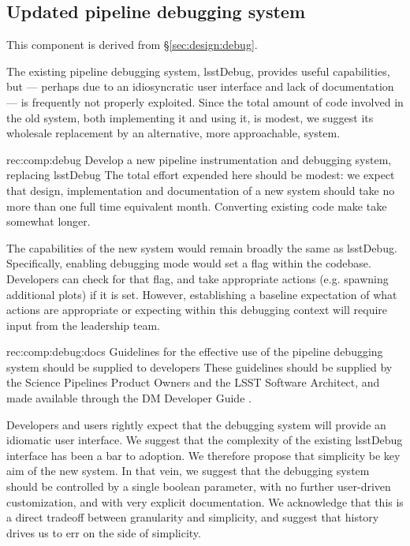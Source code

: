 \subsection{Updated pipeline debugging system}
\label{sec:comp:debug}

This component is derived from \S\ref{sec:design:debug}.

The existing pipeline debugging system, lsstDebug, provides useful
capabilities, but --- perhaps due to an idiosyncratic user interface and lack
of documentation --- is frequently not properly exploited. Since the total
amount of code involved in the old system, both implementing it and using it,
is modest, we suggest its wholesale replacement by an alternative, more
approachable, system.

\begin{recommendation}
    {rec:comp:debug}
    {Develop a new pipeline instrumentation and debugging system, replacing lsstDebug}
The total effort expended here should be modest: we expect that design,
implementation and documentation of a new system should take no more than one
full time equivalent month. Converting existing code make take somewhat
longer.
\end{recommendation}

The capabilities of the new system would remain broadly the same as lsstDebug.
Specifically, enabling debugging mode would set a flag within the codebase.
Developers can check for that flag, and take appropriate actions (e.g.
spawning additional plots) if it is set. However, establishing a baseline
expectation of what actions are appropriate or expecting within this debugging
context will require input from the leadership team.

\begin{recommendation}
    {rec:comp:debug:docs}
    {Guidelines for the effective use of the pipeline debugging system should be supplied to developers}
These guidelines should be supplied by the Science Pipelines Product Owners
and the LSST Software Architect, and made available through the DM Developer
Guide .
\end{recommendation}

Developers and users rightly expect that the debugging system will provide an
idiomatic user interface. We suggest that the complexity of the existing
lsstDebug interface has been a bar to adoption. We therefore propose that
simplicity be key aim of the new system. In that vein, we suggest that the
debugging system should be controlled by a single boolean parameter, with no
further user-driven customization, and with very explicit documentation. We
acknowledge that this is a direct tradeoff between granularity and simplicity,
and suggest that history drives us to err on the side of simplicity.

